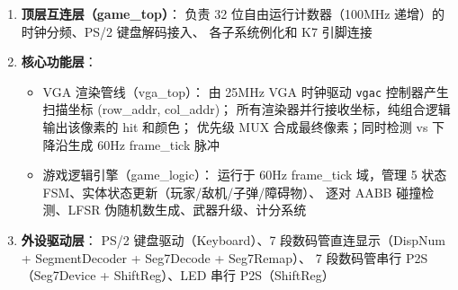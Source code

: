 \documentclass[12pt,a4paper]{ctexart}
\begin{document}
\begin{enumerate}[label=(\arabic*)]
    \item \textbf{顶层互连层（game\_top）}：
    负责 32 位自由运行计数器（100MHz 递增）的时钟分频、PS/2 键盘解码接入、
    各子系统例化和 K7 引脚连接
    \item \textbf{核心功能层}：
    \begin{itemize}
        \item VGA 渲染管线（vga\_top）：
        由 25MHz VGA 时钟驱动 \texttt{vgac} 控制器产生扫描坐标 (row\_addr, col\_addr)；
        所有渲染器并行接收坐标，纯组合逻辑输出该像素的 hit 和颜色；
        优先级 MUX 合成最终像素；同时检测 vs 下降沿生成 60Hz frame\_tick 脉冲
        \item 游戏逻辑引擎（game\_logic）：
        运行于 60Hz frame\_tick 域，管理 5 状态 FSM、实体状态更新（玩家/敌机/子弹/障碍物）、
        逐对 AABB 碰撞检测、LFSR 伪随机数生成、武器升级、计分系统
    \end{itemize}
    \item \textbf{外设驱动层}：
     PS/2 键盘驱动（Keyboard）、7 段数码管直连显示（DispNum + SegmentDecoder + Seg7Decode + Seg7Remap）、
    7 段数码管串行 P2S（Seg7Device + ShiftReg）、LED 串行 P2S（ShiftReg）
\end{enumerate}
\end{document}
